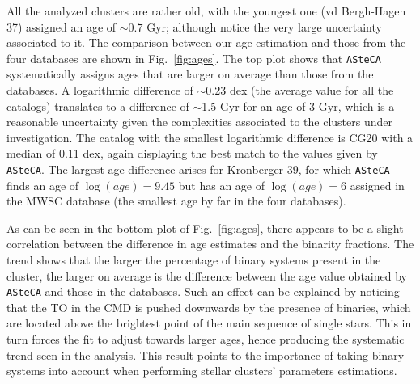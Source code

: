 \documentclass[draft]{aa}
\begin{document}
  All the analyzed clusters are rather old, with the youngest one (vd
  Bergh-Hagen 37) assigned an age of $\sim0.7$ Gyr; although notice the very
  large uncertainty associated to it.
  The comparison between our age estimation and those from
  the four databases are shown in Fig.~\ref{fig:ages}. The top plot
  shows that \texttt{ASteCA} systematically assigns ages that are larger on
  average than those from the databases.
  A logarithmic difference of $\sim$0.23 dex (the average value for
  all the catalogs) translates to a difference of $\sim$1.5 Gyr for
  an age of 3 Gyr, which is a reasonable uncertainty given the complexities
  associated to the clusters under investigation. The catalog with the
  smallest logarithmic difference is CG20 with a median of 0.11 dex, again
  displaying the best match to the values given by \texttt{ASteCA}.
  The largest age difference arises for Kronberger 39, for
  which \texttt{ASteCA} finds an age of $\log(age)=9.45$ but has an age of
  $\log(age)=6$ assigned in the MWSC database (the smallest age by far in the four
  databases).

  As can be seen in the bottom plot of Fig.~\ref{fig:ages}, there appears to be
  a slight correlation between the difference in age estimates and the
  binarity fractions. The trend shows that the larger the percentage of
  binary systems present in the cluster, the larger on average is the difference
  between the age value obtained by \texttt{ASteCA} and those in the
  databases. Such an effect can be explained by noticing that the TO in the CMD
  is pushed downwards by the presence of binaries, which are located above the
  brightest point of the main sequence of single stars. This in turn forces the
  fit to adjust towards larger ages, hence producing the systematic trend
  seen in the analysis. This result points to the importance of taking binary
  systems into account when performing stellar clusters' parameters estimations.
  \\
\end{document}
